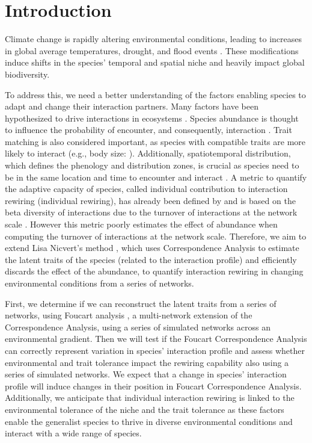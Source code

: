 \section{Introduction}


Climate change is rapidly altering environmental conditions, leading to increases in global average temperatures, drought, and flood events \citep{thornton_climate_2014}. These modifications induce shifts in the species' temporal and spatial niche and heavily impact global biodiversity\citep{bellard2012impacts}.

To address this, we need a better understanding of the factors enabling species to adapt and change their interaction partners. Many factors have been hypothesized to drive interactions in ecosystems \citep{benadi_quantitative_2022}. Species abundance is thought to influence the probability of encounter, and consequently, interaction \citep{poisot_beyond_2015, dormann_identifying_2017}. Trait matching is also considered important, as species with compatible traits are more likely to interact (e.g., body size: \cite{benadi_quantitative_2022}). Additionally, spatiotemporal distribution, which defines the phenology and distribution zones, is crucial as species need to be in the same location and time to encounter and interact \citep{tylianakis_ecological_2017, caradonna_seeing_2021}.
A metric to quantify the adaptive capacity of species, called individual contribution to interaction rewiring (individual rewiring), has already been defined by \cite{toju_interaction_2024} and is based on the beta diversity of interactions due to the turnover of interactions at the network scale \citep{poisot_dissimilarity_2012}. However this metric poorly estimates the effect of abundance when computing the turnover of interactions at the network scale.
Therefore, we aim to extend Lisa Nicvert's method \citep{these_lisa_2024}, which uses Correspondence Analysis to estimate the latent traits of the species (related to the interaction profile) and efficiently discards the effect of the abundance, to quantify interaction rewiring in changing environmental conditions from a series of networks.

First, we determine if we can reconstruct the latent traits from a series of networks, using Foucart analysis \citep{foucart_sur_1978}, a multi-network extension of the Correspondence Analysis, using a series of simulated networks across an environmental gradient.
Then we will test if the Foucart Correspondence Analysis can correctly represent variation in species' interaction profile and assess whether environmental and trait tolerance impact the rewiring capability also using a series of simulated networks.
We expect that a change in species' interaction profile will induce changes in their position in Foucart Correspondence Analysis. Additionally, we anticipate that individual interaction rewiring is linked to the environmental tolerance of the niche and the trait tolerance as these factors enable the generalist species to thrive in diverse environmental conditions and interact with a wide range of species.